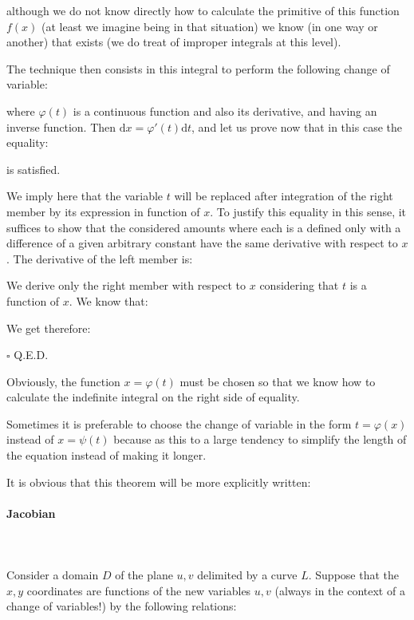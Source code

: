 	although we do not know directly how to calculate the primitive of this function $f (x)$ (at least we imagine being in that situation) we know (in one way or another) that exists (we do treat of improper integrals at this level).

	The technique then consists in this integral to perform the following change of variable:
	
	where $\varphi (t)$ is a continuous function and also its derivative, and having an inverse function. Then $\mathrm{d}x=\varphi' (t)\mathrm{d}t$, and let us prove now that in this case the equality:	
	
	is satisfied.
	\begin{dem}
	We imply here that the variable $t$ will be replaced after integration of the right member by its expression in function of $x$. To justify this equality in this sense, it suffices to show that the considered amounts where each is a defined only with a difference of a given arbitrary constant have the same derivative with respect to $x$. The derivative of the left member is:
	
	We derive only the right member with respect to $x$ considering that $t$ is a function of $x$. We know that:
	
	We get therefore:
	
	\begin{flushright}
		$\square$  Q.E.D.
	\end{flushright}
	\end{dem}
	Obviously, the function $x=\varphi (t)$ must be chosen so that we know how to calculate the indefinite integral on the right side of equality.
	\begin{tcolorbox}[title=Remark,colframe=black,arc=10pt]
	Sometimes it is preferable to choose the change of variable in the form $t=\varphi (x)$ instead of $x= \psi(t)$ because as this to a large tendency to simplify the length of the equation instead of making it longer.
	\end{tcolorbox}
	It is obvious that this theorem will be more explicitly written:
	
	
	\pagebreak
	\paragraph{Jacobian}\label{jacobian}\mbox{}\\\\
	Consider a domain $D$ of the plane  $u,v$ delimited by a curve $L$. Suppose that the $x, y$ coordinates are functions of the new variables $u, v$ (always in the context of a change of variables!) by the following relations:
	
